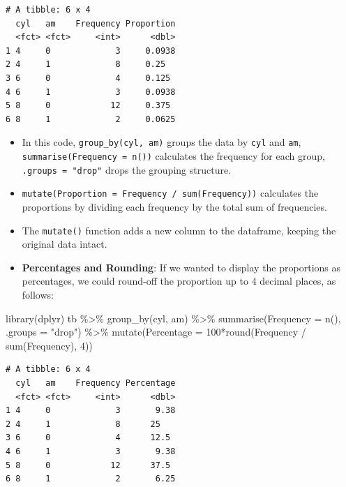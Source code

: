 \documentclass[
  letterpaper,
  DIV=11,
  numbers=noendperiod]{scrreport}
\newenvironment{Shaded}{\begin{snugshade}}{\end{snugshade}}
\newcommand{\AttributeTok}[1]{\textcolor[rgb]{0.40,0.45,0.13}{#1}}
\newcommand{\DecValTok}[1]{\textcolor[rgb]{0.68,0.00,0.00}{#1}}
\newcommand{\FunctionTok}[1]{\textcolor[rgb]{0.28,0.35,0.67}{#1}}
\newcommand{\NormalTok}[1]{\textcolor[rgb]{0.00,0.23,0.31}{#1}}
\newcommand{\SpecialCharTok}[1]{\textcolor[rgb]{0.37,0.37,0.37}{#1}}
\newcommand{\StringTok}[1]{\textcolor[rgb]{0.13,0.47,0.30}{#1}}
\begin{document}
\begin{verbatim}
# A tibble: 6 x 4
  cyl   am    Frequency Proportion
  <fct> <fct>     <int>      <dbl>
1 4     0             3     0.0938
2 4     1             8     0.25  
3 6     0             4     0.125 
4 6     1             3     0.0938
5 8     0            12     0.375 
6 8     1             2     0.0625
\end{verbatim}

\begin{itemize}
\item
  In this code, \texttt{group\_by(cyl,\ am)} groups the data by
  \texttt{cyl} and \texttt{am}, \texttt{summarise(Frequency\ =\ n())}
  calculates the frequency for each group, \texttt{.groups\ =\ "drop"}
  drops the grouping structure.
\item
  \texttt{mutate(Proportion\ =\ Frequency\ /\ sum(Frequency))}
  calculates the proportions by dividing each frequency by the total sum
  of frequencies.
\item
  The \texttt{mutate()} function adds a new column to the dataframe,
  keeping the original data intact.
\item
  \textbf{Percentages and Rounding}: If we wanted to display the
  proportions as percentages, we could round-off the proportion up to 4
  decimal places, as follows:
\end{itemize}

\begin{Shaded}
\begin{Highlighting}[]
\FunctionTok{library}\NormalTok{(dplyr)}
\NormalTok{tb }\SpecialCharTok{\%\textgreater{}\%}
  \FunctionTok{group\_by}\NormalTok{(cyl, am) }\SpecialCharTok{\%\textgreater{}\%}
  \FunctionTok{summarise}\NormalTok{(}\AttributeTok{Frequency =} \FunctionTok{n}\NormalTok{(), }\AttributeTok{.groups =} \StringTok{"drop"}\NormalTok{) }\SpecialCharTok{\%\textgreater{}\%}
  \FunctionTok{mutate}\NormalTok{(}\AttributeTok{Percentage =} \DecValTok{100}\SpecialCharTok{*}\FunctionTok{round}\NormalTok{(Frequency }\SpecialCharTok{/} \FunctionTok{sum}\NormalTok{(Frequency), }\DecValTok{4}\NormalTok{))}
\end{Highlighting}
\end{Shaded}

\begin{verbatim}
# A tibble: 6 x 4
  cyl   am    Frequency Percentage
  <fct> <fct>     <int>      <dbl>
1 4     0             3       9.38
2 4     1             8      25   
3 6     0             4      12.5 
4 6     1             3       9.38
5 8     0            12      37.5 
6 8     1             2       6.25
\end{verbatim}
\end{document}
